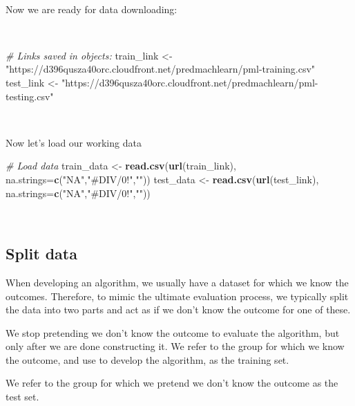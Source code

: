 \documentclass[
  10pt,
  a4paper]{article}
\newenvironment{Shaded}{\begin{snugshade}}{\end{snugshade}}
\newcommand{\CommentTok}[1]{\textcolor[rgb]{0.56,0.35,0.01}{\textit{#1}}}
\newcommand{\DataTypeTok}[1]{\textcolor[rgb]{0.13,0.29,0.53}{#1}}
\newcommand{\KeywordTok}[1]{\textcolor[rgb]{0.13,0.29,0.53}{\textbf{#1}}}
\newcommand{\NormalTok}[1]{#1}
\newcommand{\StringTok}[1]{\textcolor[rgb]{0.31,0.60,0.02}{#1}}
\begin{document}
~

Now we are ready for data downloading:

~

\begin{Shaded}
\begin{Highlighting}[]
\CommentTok{# Links saved in objects:}
\NormalTok{train_link <-}\StringTok{ "https://d396qusza40orc.cloudfront.net/predmachlearn/pml-training.csv"}
\NormalTok{test_link <-}\StringTok{ "https://d396qusza40orc.cloudfront.net/predmachlearn/pml-testing.csv"}
\end{Highlighting}
\end{Shaded}

~

Now let's load our working data

\begin{Shaded}
\begin{Highlighting}[]
\CommentTok{# Load data}
\NormalTok{train_data <-}\StringTok{ }\KeywordTok{read.csv}\NormalTok{(}\KeywordTok{url}\NormalTok{(train_link),  }\DataTypeTok{na.strings=}\KeywordTok{c}\NormalTok{(}\StringTok{"NA"}\NormalTok{,}\StringTok{"#DIV/0!"}\NormalTok{,}\StringTok{""}\NormalTok{))}
\NormalTok{test_data  <-}\StringTok{ }\KeywordTok{read.csv}\NormalTok{(}\KeywordTok{url}\NormalTok{(test_link),  }\DataTypeTok{na.strings=}\KeywordTok{c}\NormalTok{(}\StringTok{"NA"}\NormalTok{,}\StringTok{"#DIV/0!"}\NormalTok{,}\StringTok{""}\NormalTok{))}
\end{Highlighting}
\end{Shaded}

~

\hypertarget{split-data}{%
\subsection{Split data}\label{split-data}}

When developing an algorithm, we usually have a dataset for which we
know the outcomes. Therefore, to mimic the ultimate evaluation process,
we typically split the data into two parts and act as if we don't know
the outcome for one of these.

We stop pretending we don't know the outcome to evaluate the algorithm,
but only after we are done constructing it. We refer to the group for
which we know the outcome, and use to develop the algorithm, as the
training set.

We refer to the group for which we pretend we don't know the outcome as
the test set.
\end{document}
